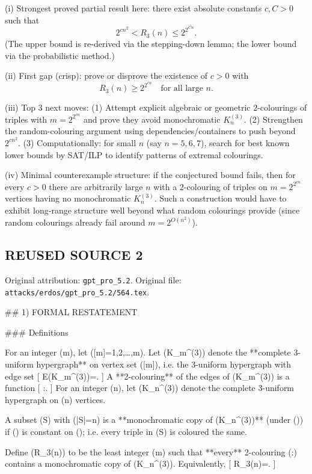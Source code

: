(i) Strongest proved partial result here: there exist absolute constants $c,C>0$ such that
\[
2^{c n^2} < R_3(n) \le 2^{2^{C n}}.
\]
(The upper bound is re-derived via the stepping-down lemma; the lower bound via the probabilistic method.)

(ii) First gap (crisp): prove or disprove the existence of $c>0$ with
\[
R_3(n) \ge 2^{2^{c n}} \quad\text{for all large }n.
\]

(iii) Top 3 next moves:
(1) Attempt explicit algebraic or geometric $2$-colourings of triples with $m=2^{2^{c n}}$ and prove they avoid monochromatic $K_n^{(3)}$.
(2) Strengthen the random-colouring argument using dependencies/containers to push beyond $2^{c n^2}$.
(3) Computationally: for small $n$ (say $n=5,6,7$), search for best known lower bounds by SAT/ILP to identify patterns of extremal colourings.

(iv) Minimal counterexample structure: if the conjectured bound fails, then for every $c>0$ there are arbitrarily large $n$ with a $2$-colouring of triples on $m=2^{2^{c n}}$ vertices having no monochromatic $K_n^{(3)}$.
Such a construction would have to exhibit long-range structure well beyond what random colourings provide (since random colourings already fail around $m=2^{O(n^2)}$).




\subsection*{REUSED SOURCE 2}
Original attribution: \texttt{gpt\_pro\_5.2}.
Original file: \texttt{attacks/erdos/gpt\_pro\_5.2/564.tex}.

## 1) FORMAL RESTATEMENT

### Definitions

For an integer (m), let ([m]={1,2,\dots,m}).
Let (K_m^{(3)}) denote the **complete 3-uniform hypergraph** on vertex set ([m]), i.e. the 3-uniform hypergraph with edge set
[
E(K_m^{(3)})=.
]
A **2-colouring** of the edges of (K_m^{(3)}) is a function
[
\chi:.
]
For an integer (n), let (K_n^{(3)}) denote the complete 3-uniform hypergraph on (n) vertices.

A subset (S\subseteq [m]) with (|S|=n) is a **monochromatic copy of (K_n^{(3)})** (under (\chi)) if (\chi) is constant on (); i.e. every triple in (S) is coloured the same.

Define (R_3(n)) to be the least integer (m) such that **every** 2-colouring (\chi:) contains a monochromatic copy of (K_n^{(3)}). Equivalently,
[
R_3(n)=\min{}.
]

